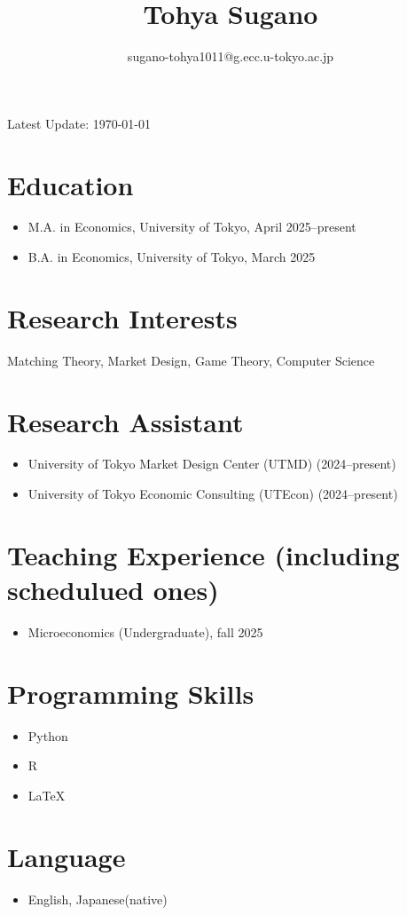 \documentclass[11pt,a4paper]{article}
\begin{document}
\title{Tohya Sugano}
\author{sugano-tohya1011@g.ecc.u-tokyo.ac.jp}
\date{}
\maketitle

\noindent Latest Update: \today

\section*{Education}
\begin{itemize}
    \item M.A. in Economics, University of Tokyo, April 2025--present
    \item B.A. in Economics, University of Tokyo, March 2025
\end{itemize}

\section*{Research Interests}
Matching Theory, Market Design, Game Theory, Computer Science

\section*{Research Assistant}
\begin{itemize}
    \item University of Tokyo Market Design Center (UTMD) (2024--present)
    \item University of Tokyo Economic Consulting (UTEcon) (2024--present)
\end{itemize}

\section*{Teaching Experience (including schedulued ones)}
\begin{itemize}
    \item Microeconomics (Undergraduate), fall 2025
\end{itemize}



\section*{Programming Skills}
\begin{itemize}
    \item Python
    \item R
    \item LaTeX
\end{itemize}

\section*{Language}
\begin{itemize}
    \item English, Japanese(native)
\end{itemize}
\end{document}
